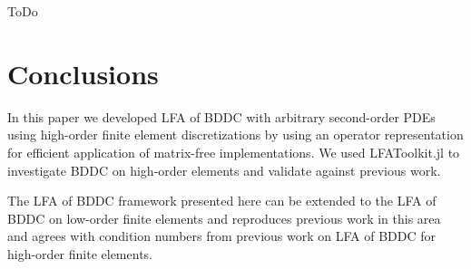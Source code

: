 \documentclass[review]{siamart190516}
\begin{document}
ToDo

\section{Conclusions}\label{sec:conclusion}

In this paper we developed LFA of BDDC with arbitrary second-order PDEs using high-order finite element discretizations by using an operator representation for efficient application of matrix-free implementations.
We used LFAToolkit.jl to investigate BDDC on high-order elements and validate against previous work.

The LFA of BDDC framework presented here can be extended to the LFA of BDDC on low-order finite elements and reproduces previous work in this area and agrees with condition numbers from previous work on LFA of BDDC for high-order finite elements.



\end{document}
